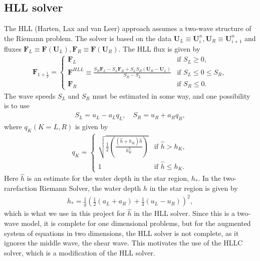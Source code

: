 \subsection{HLL solver}
The HLL (Harten, Lax and van Leer) approach assumes a two-wave structure of the Riemann problem.
The solver is based on the data $\mathbf{U}_L \equiv \mathbf{U}_i^n, \mathbf{U}_R \equiv \mathbf{U}_{i+1}^n$ and fluxes $\mathbf{F}_L \equiv \mathbf{F}(\mathbf{U}_L), \mathbf{F}_R \equiv \mathbf{F}(\mathbf{U}_R)$.
The HLL flux is given by
\begin{align}\label{eq:HLL_flux}
    \mathbf{F}_{1 + \frac{1}{2}} = \begin{cases}
        \mathbf{F}_L & \text{if } S_L \geq 0, \\
        \mathbf{F}^{HLL} \equiv \frac{S_R \mathbf{F}_L - S_L \mathbf{F}_R + S_L S_R (\mathbf{U}_R - \mathbf{U}_L)}{S_R - S_L} & \text{if } S_L \leq 0 \leq S_R, \\
        \mathbf{F}_R & \text{if } S_R \leq 0.
    \end{cases}
\end{align}
The wave speeds $S_L$ and $S_R$ must be estimated in some way, and one possibility is to use 
\begin{align*}
    S_L = u_L - a_L q_L, \quad S_R = u_R + a_R q_R,
\end{align*}
where $q_K (K=L, R)$ is given by 
\begin{align*}
    q_K = 
    \begin{cases}
        \sqrt{\frac{1}{2}\left( \frac{(\hat{h} + h_K) \hat{h}}{h_K^2} \right) } & \text{if } \hat{h} > h_K, \\
        1 & \text{if } \hat{h} \leq h_K.
    \end{cases}
\end{align*}
Here $\hat{h}$ is an estimate for the water depth in the star region, $h_*$.
In the two-rarefaction Riemann Solver, the water depth $h$ in the star region is given by
\begin{align}\label{eq:two_rarefaction_hstar}
    h_* = \frac{1}{g} {\left( \frac{1}{2} (a_L + a_R) + \frac{1}{4} (u_L - u_R)  \right)}^2,
\end{align}
which is what we use in this project for $\hat{h}$ in the HLL solver.
Since this is a two-wave model, it is complete for one dimensional problems, but for the augmented system of equations in two dimensions, the HLL solver is not complete, as it ignores the middle wave, the shear wave.
This motivates the use of the HLLC solver, which is a modification of the HLL solver.


